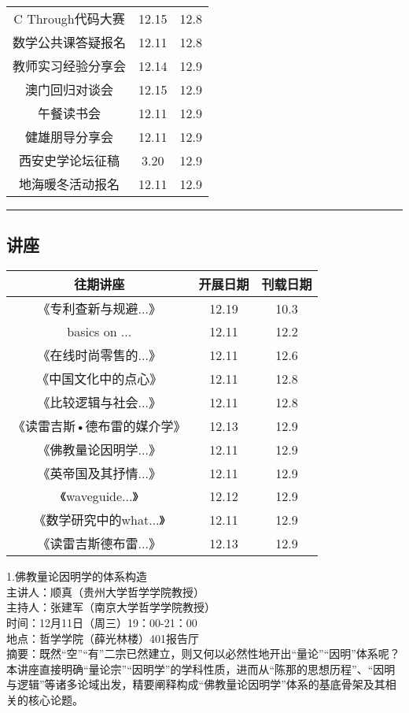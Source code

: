 \documentclass[letterpaper, 12pt]{article}
\begin{document}
\begin{multicols}{2}
{\begin{longtable}{|c|c|c|}
    C Through代码大赛 & 12.15 & 12.8\\
    数学公共课答疑报名 & 12.11 & 12.8\\
    教师实习经验分享会 & 12.14 & 12.9\\
    澳门回归对谈会 & 12.15 & 12.9\\
    午餐读书会 & 12.11 & 12.9\\
    健雄朋导分享会 & 12.11 & 12.9\\
    西安史学论坛征稿 & 3.20 & 12.9\\
    地海暖冬活动报名 & 12.11 & 12.9\\
    \hline
\end{longtable}
\unskip
\unpenalty
\unpenalty}\unvbox\colbbox
\end{multicols}
\hrule
\pagebreak
\begin{multicols}{2}

\section{讲座}
\begin{tabular}{|c|c|c|}
    \hline
    往期讲座 & 开展日期 & 刊载日期\\
    \hline\hline
    《专利查新与规避...》 & 12.19 & 10.3\\
    basics on ... & 12.11 & 12.2\\
    《在线时尚零售的...》 & 12.11 & 12.6\\
    《中国文化中的点心》& 12.11 & 12.8\\
    《比较逻辑与社会...》 & 12.11 & 12.8\\
    《读雷吉斯•德布雷的媒介学》 & 12.13 & 12.9\\
    《佛教量论因明学...》 & 12.11 & 12.9\\
    《英帝国及其抒情...》 & 12.11 & 12.9\\
    《waveguide...》 & 12.12 & 12.9\\
    《数学研究中的what...》 & 12.11 & 12.9\\
    《读雷吉斯德布雷...》 & 12.13 & 12.9\\
    \hline
\end{tabular}

1.佛教量论因明学的体系构造\\
主讲人：顺真（贵州大学哲学学院教授）\\
主持人：张建军（南京大学哲学学院教授）\\
时间：12月11日（周三）19：00-21：00\\
地点：哲学学院（薛光林楼）401报告厅\\
摘要：既然“空”“有”二宗已然建立，则又何以必然性地开出“量论”“因明”体系呢？本讲座直接明确“量论宗”“因明学”的学科性质，进而从“陈那的思想历程”、“因明与逻辑”等诸多论域出发，精要阐释构成“佛教量论因明学”体系的基底骨架及其相关的核心论题。\\


\end{multicols}
\end{document}
